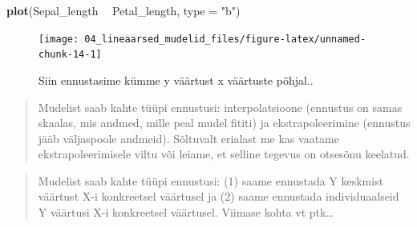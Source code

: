 \documentclass[]{book}
\newenvironment{Shaded}{\begin{snugshade}}{\end{snugshade}}
\newcommand{\KeywordTok}[1]{\textcolor[rgb]{0.13,0.29,0.53}{\textbf{#1}}}
\newcommand{\DataTypeTok}[1]{\textcolor[rgb]{0.13,0.29,0.53}{#1}}
\newcommand{\DecValTok}[1]{\textcolor[rgb]{0.00,0.00,0.81}{#1}}
\newcommand{\StringTok}[1]{\textcolor[rgb]{0.31,0.60,0.02}{#1}}
\newcommand{\OperatorTok}[1]{\textcolor[rgb]{0.81,0.36,0.00}{\textbf{#1}}}
\newcommand{\NormalTok}[1]{#1}
\begin{document}
\begin{Shaded}
\end{Shaded}

\begin{Shaded}
\begin{Highlighting}[]
\KeywordTok{plot}\NormalTok{(Sepal_length }\OperatorTok{~}\StringTok{ }\NormalTok{Petal_length, }\DataTypeTok{type =} \StringTok{"b"}\NormalTok{)}
\end{Highlighting}
\end{Shaded}

\begin{figure}

{\centering \texttt{[image: 04\_lineaarsed\_mudelid\_files/figure-latex/unnamed-chunk-14-1]} 

}

\caption{Siin ennustasime kümme y väärtust x väärtuste põhjal..}\label{fig:unnamed-chunk-14}
\end{figure}

\begin{quote}
Mudelist saab kahte tüüpi ennustusi: interpolatsioone (ennustus on samas
skaalas, mis andmed, mille peal mudel fititi) ja ekstrapoleerimine
(ennustus jääb väljaspoole andmeid). Sõltuvalt erialast me kas vaatame
ekstrapoleerimisele viltu või leiame, et selline tegevus on otsesõnu
keelatud.
\end{quote}

\begin{quote}
Mudelist saab kahte tüüpi ennustusi: (1) saame ennustada Y keskmist
väärtust X-i konkreetsel väärtusel ja (2) saame ennustada
individuaalseid Y väärtusi X-i konkreetsel väärtusel. Viimase kohta vt
ptk\ldots{}
\end{quote}
\end{document}
